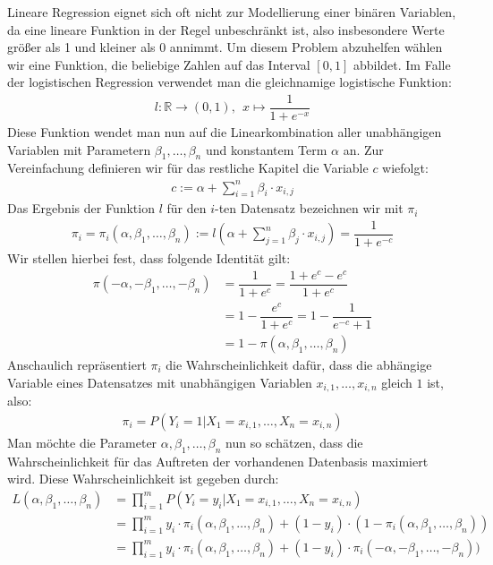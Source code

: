 Lineare Regression eignet sich oft nicht zur Modellierung einer binären Variablen, da eine lineare Funktion in der Regel unbeschränkt ist, also insbesondere Werte größer als 1 und kleiner als 0 annimmt. Um diesem Problem abzuhelfen wählen wir eine Funktion, die beliebige Zahlen auf das Interval $[0, 1]$ abbildet. Im Falle der logistischen Regression verwendet man die gleichnamige logistische Funktion:
\begin{align*}
    l: \mathbb{R} \rightarrow (0, 1),~~ x \mapsto \dfrac{1}{1+e^{-x}}
\end{align*}
Diese Funktion wendet man nun auf die Linearkombination aller unabhängigen Variablen mit Parametern $\beta_1, \dots, \beta_n$ und konstantem Term $\alpha$ an. Zur Vereinfachung definieren wir für das restliche Kapitel die Variable $c$ wiefolgt:
\begin{align*}
    c := \alpha + \sum_{i=1}^n \beta_i \cdot x_{i, j}
\end{align*}
Das Ergebnis der Funktion $l$ für den $i$-ten Datensatz bezeichnen wir mit $\pi_i$
\begin{align*}
    \pi_i = \pi_i(\alpha, \beta_1, \dots, \beta_n) := l \left( \alpha + \sum_{j=1}^n \beta_j \cdot x_{i, j} \right) = \dfrac{1}{1 + e^{-c}}
\end{align*}
Wir stellen hierbei fest, dass folgende Identität gilt:
\begin{align*}
    \pi(- \alpha, - \beta_1, \dots, - \beta_n) &= \dfrac{1}{1 + e^c} = \dfrac{1 + e^c - e^c}{1 + e^c} \\
    &= 1 - \dfrac{e^c}{1 + e^c} = 1 - \dfrac{1}{e^{-c} + 1} \\
    &= 1 - \pi(\alpha, \beta_1, \dots, \beta_n)
\end{align*}
Anschaulich repräsentiert $\pi_i$ die Wahrscheinlichkeit dafür, dass die abhängige Variable eines Datensatzes mit unabhängigen Variablen $x_{i, 1}, \dots, x_{i, n}$ gleich $1$ ist, also:
\begin{align*}
    \pi_i = P(Y_i = 1 | X_1 = x_{i, 1}, \dots, X_n = x_{i, n})
\end{align*}
Man möchte die Parameter $\alpha, \beta_1, \dots, \beta_n$ nun so schätzen, dass die Wahrscheinlichkeit für das Auftreten der vorhandenen Datenbasis maximiert wird. Diese Wahrscheinlichkeit ist gegeben durch:
\begin{align*}
    L(\alpha, \beta_1, \dots, \beta_n) &= \prod_{i=1}^m P(Y_i = y_i | X_1 = x_{i, 1}, \dots, X_n = x_{i, n}) \\
    &= \prod_{i=1}^m y_i \cdot \pi_i(\alpha, \beta_1, \dots, \beta_n) + (1 - y_i) \cdot (1 - \pi_i(\alpha, \beta_1, \dots, \beta_n)) \\
    &= \prod_{i=1}^m y_i \cdot \pi_i(\alpha, \beta_1, \dots, \beta_n) + (1 - y_i) \cdot \pi_i(- \alpha, - \beta_1, \dots, - \beta_n))
\end{align*}
